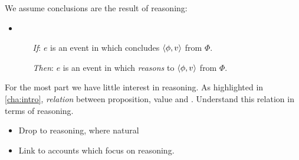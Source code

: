 \begin{note}
  We assume conclusions are the result of reasoning:

  \begin{assumption}
    \label{assu:ConRea}

    \begin{itemize}
    \item
      \begin{itemize}
      \item[\emph{If}:]
        \(e\) is an event in which \vAgent{} concludes \(\langle \phi, v \rangle\) from \(\Phi\).
      \item[\emph{Then}:]
        \(e\) is an event in which \vAgent{} \emph{reasons} to \(\langle \phi, v \rangle\) from \(\Phi\).
      \end{itemize}
    \end{itemize}
    \vspace{-\baselineskip}
  \end{assumption}

  For the most part we have little interest in reasoning.
  As highlighted in \autoref{cha:intro}, \emph{relation} between proposition, value and \pool{}.
  Understand this relation in terms of reasoning.

  \begin{itemize}
  \item
    Drop to reasoning, where natural
  \item
    Link to accounts which focus on reasoning.
  \end{itemize}
\end{note}

